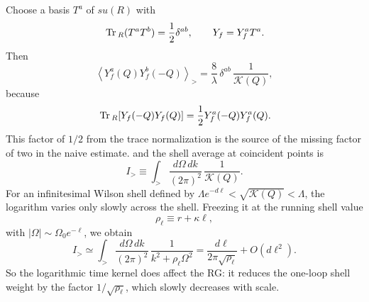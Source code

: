 \documentclass[aps,prx,preprint,amsmath,amssymb]{revtex4-2}
\newcommand{\Tr}{{\rm \, Tr\,}}
\begin{document}
Choose a basis \(T^a\) of \(su(R)\) with
\begin{equation}
\Tr_R(T^a T^b)=\frac{1}{2}\delta^{ab},
\qquad
Y_f = Y_f^a T^a .
\end{equation}
Then
\begin{equation}\label{eq:Yf-prop}
\left\langle
Y_f^a(Q)Y_f^b(-Q)
\right\rangle_>
=
\frac{8}{\lambda}\,\delta^{ab}\,\frac{1}{\mathcal K(Q)},
\end{equation}
because
\begin{equation}
\Tr_R\!\left[Y_f(-Q)Y_f(Q)\right]
=
\frac{1}{2}Y_f^a(-Q)Y_f^a(Q).
\end{equation}
This factor of \(1/2\) from the trace normalization is the source of the
missing factor of two in the naive estimate.
and the shell average at coincident points is
\begin{equation}\label{eq:I-shell}
I_>\equiv
\int_>\frac{d\Omega\,dk}{(2\pi)^2}\,\frac{1}{\mathcal K(Q)}.
\end{equation}
For an infinitesimal Wilson shell defined by
\(\Lambda e^{-d\ell}<\sqrt{\mathcal K(Q)}<\Lambda\), the logarithm varies only
slowly across the shell.  Freezing it at the running shell value
\begin{equation}
\rho_\ell \equiv r+\kappa \ell,
\end{equation}
with \(|\Omega| \sim \Omega_0 e^{-\ell}\), we obtain
\begin{equation}\label{eq:I-shell-dl}
I_>
\simeq
\int_>\frac{d\Omega\,dk}{(2\pi)^2}\,\frac{1}{k^2+\rho_\ell \Omega^2}
=
\frac{d\ell}{2\pi\sqrt{\rho_\ell}}
+O(d\ell^2).
\end{equation}
So the logarithmic time kernel does affect the RG: it reduces the one-loop shell
weight by the factor \(1/\sqrt{\rho_\ell}\), which slowly decreases with scale.
\end{document}
